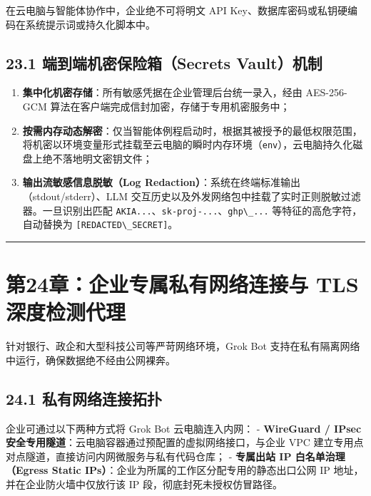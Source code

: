 \documentclass[10.5pt,a4paper,oneside]{report}
\providecommand{\tightlist}{\setlength{\itemsep}{0pt}\setlength{\parskip}{0pt}}
\newcommand{\passthrough}[1]{#1}
\begin{document}
在云电脑与智能体协作中，企业绝不可将明文 API
Key、数据库密码或私钥硬编码在系统提示词或持久化脚本中。

\subsection{23.1 端到端机密保险箱（Secrets
Vault）机制}\label{ux7aefux5230ux7aefux673aux5bc6ux4fddux9669ux7bb1secrets-vaultux673aux5236}

\begin{enumerate}
\def\labelenumi{\arabic{enumi}.}
\tightlist
\item
  \textbf{集中化机密存储}：所有敏感凭据在企业管理后台统一录入，经由
  AES-256-GCM 算法在客户端完成信封加密，存储于专用机密服务中；
\item
  \textbf{按需内存动态解密}：仅当智能体例程启动时，根据其被授予的最低权限范围，将机密以环境变量形式挂载至云电脑的瞬时内存环境（\passthrough{\lstinline!env!}），云电脑持久化磁盘上绝不落地明文密钥文件；
\item
  \textbf{输出流敏感信息脱敏（Log
  Redaction）}：系统在终端标准输出（stdout/stderr）、LLM
  交互历史以及外发网络包中挂载了实时正则脱敏过滤器。一旦识别出匹配
  \passthrough{\lstinline!AKIA...!}、\passthrough{\lstinline!sk-proj-...!}、\passthrough{\lstinline!ghp\_...!}
  等特征的高危字符，自动替换为
  \passthrough{\lstinline![REDACTED\_SECRET]!}。
\end{enumerate}

\begin{center}\rule{0.5\linewidth}{0.5pt}\end{center}

\section{第24章：企业专属私有网络连接与 TLS
深度检测代理}\label{ux7b2c24ux7ae0ux4f01ux4e1aux4e13ux5c5eux79c1ux6709ux7f51ux7edcux8fdeux63a5ux4e0e-tls-ux6df1ux5ea6ux68c0ux6d4bux4ee3ux7406}

针对银行、政企和大型科技公司等严苛网络环境，Grok Bot
支持在私有隔离网络中运行，确保数据绝不经由公网裸奔。

\subsection{24.1
私有网络连接拓扑}\label{ux79c1ux6709ux7f51ux7edcux8fdeux63a5ux62d3ux6251}

企业可通过以下两种方式将 Grok Bot 云电脑连入内网： - \textbf{WireGuard /
IPsec 安全专用隧道}：云电脑容器通过预配置的虚拟网络接口，与企业 VPC
建立专用点对点隧道，直接访问内网微服务与私有代码仓库； -
\textbf{专属出站 IP 白名单治理（Egress Static
IPs）}：企业为所属的工作区分配专用的静态出口公网 IP
地址，并在企业防火墙中仅放行该 IP 段，彻底封死未授权仿冒路径。
\end{document}
